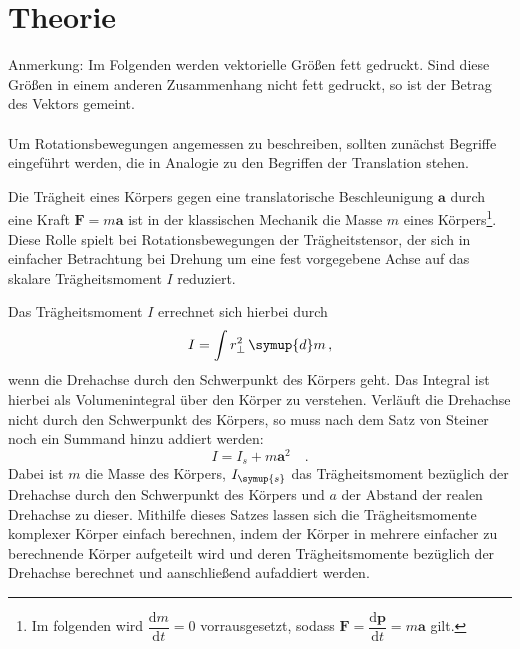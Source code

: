 \section{Theorie}
\label{sec:Theorie}
Anmerkung: Im Folgenden werden vektorielle Größen fett gedruckt. Sind diese Größen
in einem anderen Zusammenhang nicht fett gedruckt, so ist der Betrag des Vektors
gemeint.
\\
\\
Um Rotationsbewegungen angemessen zu beschreiben, sollten zunächst Begriffe
eingeführt werden, die in Analogie zu den Begriffen der Translation stehen.

Die Trägheit eines Körpers gegen eine translatorische Beschleunigung $\symbf{a}$
durch eine Kraft $\symbf{F}=m\symbf{a}$ ist in der klassischen Mechanik die
Masse $m$ eines Körpers\footnote{Im folgenden wird
$\dfrac{\mathrm{d}m}{\mathrm{d}t}=0$ vorrausgesetzt, sodass
$\symbf{F}=\dfrac{\mathrm{d}\symbf{p}}{\mathrm{d}t}=m\symbf{a}$ gilt.}.
Diese Rolle spielt bei Rotationsbewegungen der Trägheitstensor, der sich in
einfacher Betrachtung bei Drehung um eine fest vorgegebene Achse auf das skalare
Trägheitsmoment $I$ reduziert.

Das Trägheitsmoment $I$ errechnet sich hierbei durch
\begin{equation}
  I=\int r_{\perp}^2 \,\symup{d}m\,,
  \label{eqn:traegheitallg}
\end{equation}
wenn die Drehachse durch den Schwerpunkt des Körpers geht. Das Integral ist hierbei
als Volumenintegral über den Körper zu verstehen. Verläuft die Drehachse nicht
durch den Schwerpunkt des Körpers, so muss nach dem Satz von Steiner noch ein
Summand hinzu addiert werden:
\begin{equation}
  I=I_s+m\symbf{a}^2\quad.
  \label{eqn:steiner}
\end{equation}
Dabei ist $m$ die Masse des Körpers, $I_{\symup{s}}$ das Trägheitsmoment bezüglich
der Drehachse durch den Schwerpunkt des Körpers und $a$ der Abstand der realen
Drehachse zu dieser. Mithilfe dieses Satzes lassen sich die Trägheitsmomente
komplexer Körper einfach berechnen, indem der Körper in mehrere einfacher zu berechnende
Körper aufgeteilt wird und deren Trägheitsmomente bezüglich der Drehachse berechnet
und aanschließend aufaddiert werden.

